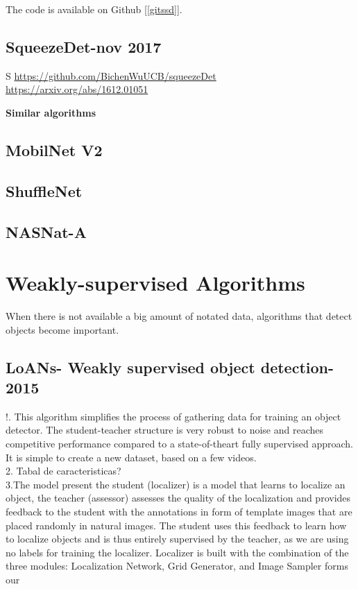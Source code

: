 \documentclass[10pt]{article}
\begin{document}
The code is available on Github [\ref{gitssd}].
\newpage


\subsection{SqueezeDet-nov 2017}
S \cite{wu2017squeezedet}
\url{https://github.com/BichenWuUCB/squeezeDet}
\url{https://arxiv.org/abs/1612.01051}


\textbf{Similar algorithms}
\subsection{MobilNet V2}
\subsection{ShuffleNet}
\subsection{NASNat-A}




\newpage    
\section{Weakly-supervised Algorithms}
When there is not available a big amount of notated data, algorithms that detect objects become important.


\subsection{LoANs- Weakly supervised object detection-2015}

!. This algorithm simplifies the process of gathering data for training an object detector. The student-teacher structure is very robust to noise and reaches competitive performance compared to a state-of-theart fully supervised approach. It is simple to create a new dataset, based on a few videos\cite{bartz2018loans}.\\
2. Tabal de caracteristicas?\\

3.The model present the student (localizer) is a model that learns to localize an object, the teacher (assessor) assesses the quality of the localization and provides feedback to the student with the annotations in form of template images that are placed randomly in natural images. The student uses this feedback to learn how to localize objects and is thus entirely supervised by the teacher, as we are using no labels for training the localizer. Localizer is built with the combination of the three modules: Localization Network, Grid Generator, and Image Sampler forms our 
\end{document}

